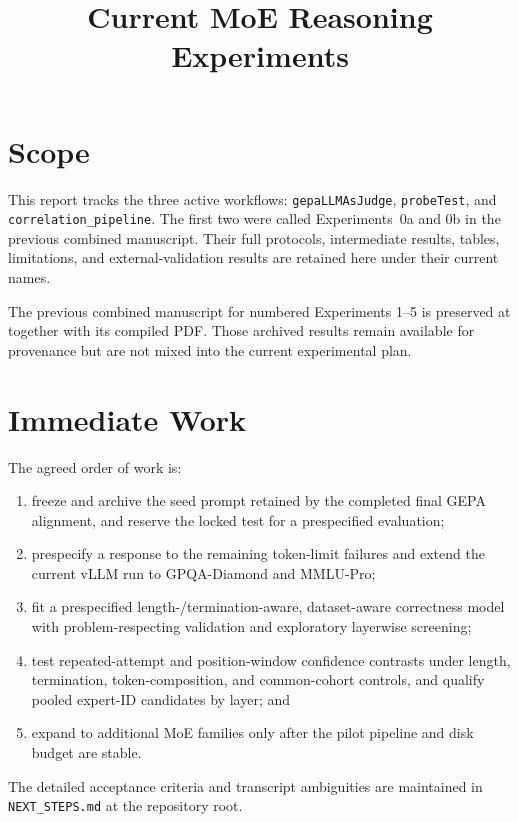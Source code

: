 \documentclass[manuscript,screen,review]{jair}
\begin{document}
\title{Current MoE Reasoning Experiments}

\maketitle

\section{Scope}

This report tracks the three active workflows: \texttt{gepaLLMAsJudge},
\texttt{probeTest}, and \texttt{correlation\_pipeline}.  The first two were
called Experiments~0a and 0b in the previous combined manuscript.  Their full
protocols, intermediate results, tables, limitations, and external-validation
results are retained here under their current names.

The previous combined manuscript for numbered Experiments 1--5 is preserved at
 together with its compiled PDF.
Those archived results remain available for provenance but are not mixed into
the current experimental plan.







\section{Immediate Work}

The agreed order of work is:
\begin{enumerate}
\item freeze and archive the seed prompt retained by the completed final GEPA
alignment, and reserve the locked test for a prespecified evaluation;
\item prespecify a response to the remaining token-limit failures and extend
the current vLLM run to GPQA-Diamond and MMLU-Pro;
\item fit a prespecified length-/termination-aware, dataset-aware correctness
model with problem-respecting validation and exploratory layerwise screening;
\item test repeated-attempt and position-window confidence contrasts under
length, termination, token-composition, and common-cohort controls, and qualify
pooled expert-ID candidates by layer; and
\item expand to additional MoE families only after the pilot pipeline and disk
budget are stable.
\end{enumerate}
The detailed acceptance criteria and transcript ambiguities are maintained in
\texttt{NEXT\_STEPS.md} at the repository root.



\clearpage


\clearpage


\end{document}
